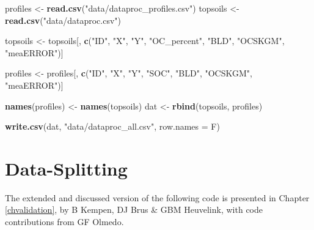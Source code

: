 \documentclass[10pt,b5paper,]{book}
\newenvironment{Shaded}{\begin{snugshade}}{\end{snugshade}}
\newcommand{\DataTypeTok}[1]{\textcolor[rgb]{0.13,0.29,0.53}{#1}}
\newcommand{\KeywordTok}[1]{\textcolor[rgb]{0.13,0.29,0.53}{\textbf{#1}}}
\newcommand{\NormalTok}[1]{#1}
\newcommand{\StringTok}[1]{\textcolor[rgb]{0.31,0.60,0.02}{#1}}
\theoremstyle{definition}
\theoremstyle{definition}
\theoremstyle{definition}
\theoremstyle{remark}
\begin{document}
\begin{Shaded}
\begin{Highlighting}[]
\NormalTok{profiles <-}\StringTok{ }\KeywordTok{read.csv}\NormalTok{(}\StringTok{"data/dataproc_profiles.csv"}\NormalTok{)}
\NormalTok{topsoils <-}\StringTok{ }\KeywordTok{read.csv}\NormalTok{(}\StringTok{"data/dataproc.csv"}\NormalTok{)}

\NormalTok{topsoils <-}\StringTok{ }\NormalTok{topsoils[, }\KeywordTok{c}\NormalTok{(}\StringTok{"ID"}\NormalTok{, }\StringTok{"X"}\NormalTok{, }\StringTok{"Y"}\NormalTok{, }\StringTok{"OC_percent"}\NormalTok{, }\StringTok{"BLD"}\NormalTok{,}
                         \StringTok{"OCSKGM"}\NormalTok{, }\StringTok{"meaERROR"}\NormalTok{)]}

\NormalTok{profiles <-}\StringTok{ }\NormalTok{profiles[, }\KeywordTok{c}\NormalTok{(}\StringTok{"ID"}\NormalTok{, }\StringTok{"X"}\NormalTok{, }\StringTok{"Y"}\NormalTok{, }\StringTok{"SOC"}\NormalTok{, }\StringTok{"BLD"}\NormalTok{,}
                         \StringTok{"OCSKGM"}\NormalTok{, }\StringTok{"meaERROR"}\NormalTok{)]}

\KeywordTok{names}\NormalTok{(profiles) <-}\StringTok{ }\KeywordTok{names}\NormalTok{(topsoils)}
\NormalTok{dat <-}\StringTok{ }\KeywordTok{rbind}\NormalTok{(topsoils, profiles)}

\KeywordTok{write.csv}\NormalTok{(dat, }\StringTok{"data/dataproc_all.csv"}\NormalTok{, }\DataTypeTok{row.names =}\NormalTok{ F)}
\end{Highlighting}
\end{Shaded}

\clearpage

\hypertarget{cd:data-splitting}{%
\section{Data-Splitting}\label{cd:data-splitting}}

The extended and discussed version of the following code is presented in
Chapter \ref{chvalidation}, by B Kempen, DJ Brus \& GBM Heuvelink, with
code contributions from GF Olmedo.
\end{document}
